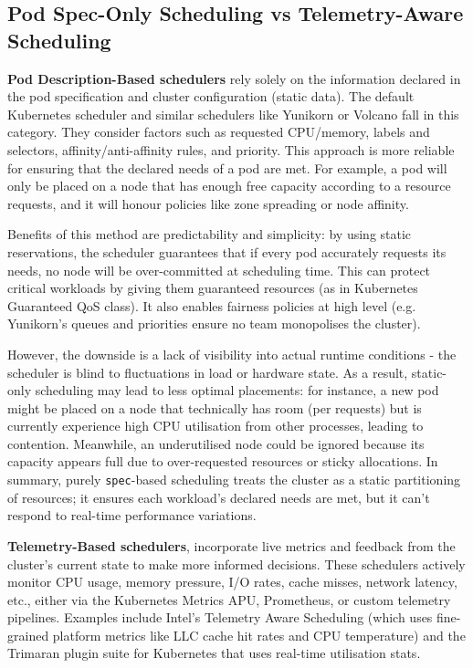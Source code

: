 \subsection{Pod Spec-Only Scheduling vs Telemetry-Aware Scheduling}

\textbf{Pod Description-Based schedulers} rely solely on the information
declared in the pod specification and cluster configuration (static data). The
default Kubernetes scheduler \cite{kube-scheduler} and similar schedulers like
Yunikorn \cite{cloudera_yunikorn_2019} or Volcano \cite{volcano_introduction}
fall in this category. They consider factors such as requested CPU/memory,
labels and selectors, affinity/anti-affinity rules, and priority. This approach
is more reliable for ensuring that the declared needs of a pod are met. For
example, a pod will only be placed on a node that has enough free capacity
according to a resource requests, and it will honour policies like zone
spreading or node affinity.

Benefits of this method are predictability and simplicity: by using static
reservations, the scheduler guarantees that if every pod accurately requests
its needs, no node will be over-committed at scheduling time. This can protect
critical workloads by giving them guaranteed resources (as in Kubernetes
Guaranteed QoS class). It also enables fairness policies at high level (e.g.
Yunikorn's queues and priorities ensure no team monopolises the cluster).

However, the downside is a lack of visibility into actual runtime conditions -
the scheduler is blind to fluctuations in load or hardware state. As a result,
static-only scheduling may lead to less optimal placements: for instance, a new
pod might be placed on a node that technically has room (per requests) but is
currently experience high CPU utilisation from other processes, leading to
contention. Meanwhile, an underutilised node could be ignored because its
capacity appears full due to over-requested resources or sticky allocations. In
summary, purely \verb|spec|-based scheduling treats the cluster as a static
partitioning of resources; it ensures each workload's declared needs are met, but
it can't respond to real-time performance variations.

\textbf{Telemetry-Based schedulers}, incorporate live metrics and feedback from
the cluster's current state to make more informed decisions. These schedulers
actively monitor CPU usage, memory pressure, I/O rates, cache misses, network
latency, etc., either via the Kubernetes Metrics APU, Prometheus, or custom
telemetry pipelines. Examples include Intel's Telemetry Aware Scheduling \cite{intel-tas}
(which uses fine-grained platform metrics like LLC cache hit rates and CPU
temperature) and the Trimaran plugin suite for Kubernetes \cite{trimaran} that uses
real-time utilisation stats.

